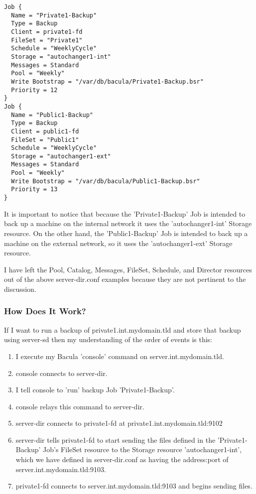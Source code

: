 \footnotesize
\begin{verbatim}
Job {
  Name = "Private1-Backup"
  Type = Backup
  Client = private1-fd
  FileSet = "Private1"
  Schedule = "WeeklyCycle"
  Storage = "autochanger1-int"
  Messages = Standard
  Pool = "Weekly"
  Write Bootstrap = "/var/db/bacula/Private1-Backup.bsr"
  Priority = 12
}
Job {
  Name = "Public1-Backup"
  Type = Backup
  Client = public1-fd
  FileSet = "Public1"
  Schedule = "WeeklyCycle"
  Storage = "autochanger1-ext"
  Messages = Standard
  Pool = "Weekly"
  Write Bootstrap = "/var/db/bacula/Public1-Backup.bsr"
  Priority = 13
}
\end{verbatim}
\normalsize

It is important to notice that because the 'Private1-Backup' Job is intended
to back up a machine on the internal network it uses the 'autochanger1-int'
Storage resource. On the other hand, the 'Public1-Backup' Job is intended to
back up a machine on the external network, so it uses the 'autochanger1-ext'
Storage resource. 

I have left the Pool, Catalog, Messages, FileSet, Schedule, and Director
resources out of the above server-dir.conf examples because they are not
pertinent to the discussion. 

\subsubsection*{How Does It Work?}

If I want to run a backup of private1.int.mydomain.tld and store that backup
using server-sd then my understanding of the order of events is this: 

\begin{enumerate}
\item I execute my Bacula 'console' command on server.int.mydomain.tld.  
\item console connects to server-dir.  
\item I tell console to 'run' backup Job 'Private1-Backup'.  
\item console relays this command to server-dir.  
\item server-dir connects to private1-fd at private1.int.mydomain.tld:9102  
\item server-dir tells private1-fd to start sending the files defined in  the
   'Private1-Backup' Job's FileSet resource to the Storage resource 
   'autochanger1-int', which we have defined in server-dir.conf as having the 
address:port of server.int.mydomain.tld:9103.  
\item private1-fd connects to server.int.mydomain.tld:9103 and begins sending 
   files. 
   \end{enumerate}

